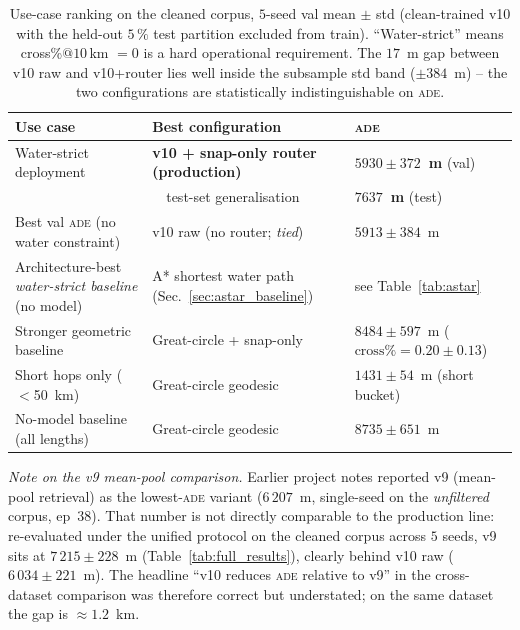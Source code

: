 \documentclass[oneside, a4paper, onecolumn, 11pt]{article}
\newcommand{\ade}{\textsc{ade}}
\begin{document}
\begin{table}[h]
\centering
\caption{Use-case ranking on the cleaned corpus, $5$-seed val mean
$\pm$ std (clean-trained v10 with the held-out $5\,\%$ test partition
excluded from train).  ``Water-strict'' means cross\%$@10$\,km $= 0$
is a hard operational requirement.  The $17$~m gap between v10 raw
and v10+router lies well inside the subsample std band
($\pm 384$~m) -- the two configurations are statistically
indistinguishable on \ade.}
\label{tab:usecase}
\begin{tabular}{lll}
\toprule
\textbf{Use case} & \textbf{Best configuration} & \textbf{\ade} \\
\midrule
Water-strict deployment            & \textbf{v10 + snap-only router (production)}
                                    & \textbf{$5930 \pm 372$~m} (val) \\
                                   & ~~test-set generalisation
                                    & \textbf{$7637$~m} (test) \\
Best val \ade{} (no water constraint) & v10 raw (no router; \emph{tied})
                                    & $5913 \pm 384$~m \\
Architecture-best \emph{water-strict baseline} (no model)
                                    & A* shortest water path (Sec.~\ref{sec:astar_baseline})
                                    & see Table~\ref{tab:astar} \\
Stronger geometric baseline        & Great-circle + snap-only
                                    & $8484 \pm 597$~m
                                      ($\text{cross\%} = 0.20 \pm 0.13$) \\
Short hops only ($<$50~km)         & Great-circle geodesic
                                    & $1431 \pm 54$~m (short bucket) \\
No-model baseline (all lengths)    & Great-circle geodesic
                                    & $8735 \pm 651$~m \\
\bottomrule
\end{tabular}
\end{table}

\emph{Note on the v9 mean-pool comparison.}  Earlier project notes
reported v9 (mean-pool retrieval) as the lowest-\ade{} variant
($6\,207$~m, single-seed on the \emph{unfiltered} corpus, ep~$38$).
That number is not directly comparable to the production line:
re-evaluated under the unified protocol on the cleaned corpus across
$5$ seeds, v9 sits at $7\,215 \pm 228$~m
(Table~\ref{tab:full_results}), clearly behind v10 raw
($6\,034 \pm 221$~m).  The headline ``v10 reduces \ade{} relative
to v9'' in the cross-dataset comparison was therefore correct but
understated; on the same dataset the gap is $\approx 1.2$~km.
\end{document}
